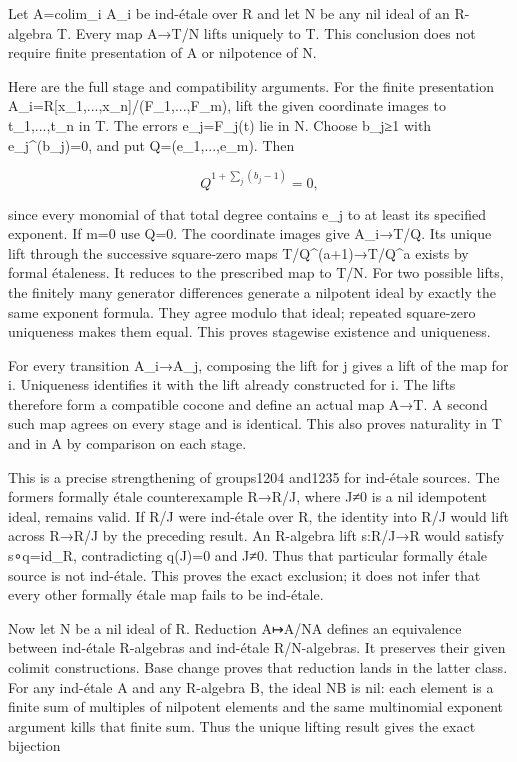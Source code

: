 Let A=colim\_i A\_i be ind-étale over R and let N be any nil ideal of an R-algebra T. Every map A→T/N lifts uniquely to T. This conclusion does not require finite presentation of A or nilpotence of N.

Here are the full stage and compatibility arguments. For the finite presentation A\_i=R{[}x\_1,...,x\_n{]}/(F\_1,...,F\_m), lift the given coordinate images to t\_1,...,t\_n in T. The errors e\_j=F\_j(t) lie in N. Choose b\_j≥1 with e\_j\^{}(b\_j)=0, and put Q=(e\_1,...,e\_m). Then

\[
Q^{1+\sum_j(b_j-1)}=0,
\]

since every monomial of that total degree contains e\_j to at least its specified exponent. If m=0 use Q=0. The coordinate images give A\_i→T/Q. Its unique lift through the successive square-zero maps T/Q\^{}(a+1)→T/Q\^{}a exists by formal étaleness. It reduces to the prescribed map to T/N. For two possible lifts, the finitely many generator differences generate a nilpotent ideal by exactly the same exponent formula. They agree modulo that ideal; repeated square-zero uniqueness makes them equal. This proves stagewise existence and uniqueness.

For every transition A\_i→A\_j, composing the lift for j gives a lift of the map for i. Uniqueness identifies it with the lift already constructed for i. The lifts therefore form a compatible cocone and define an actual map A→T. A second such map agrees on every stage and is identical. This also proves naturality in T and in A by comparison on each stage.

This is a precise strengthening of groups1204 and1235 for ind-étale sources. The former\textquotesingle s formally étale counterexample R→R/J, where J≠0 is a nil idempotent ideal, remains valid. If R/J were ind-étale over R, the identity into R/J would lift across R→R/J by the preceding result. An R-algebra lift s:R/J→R would satisfy s∘q=id\_R, contradicting q(J)=0 and J≠0. Thus that particular formally étale source is not ind-étale. This proves the exact exclusion; it does not infer that every other formally étale map fails to be ind-étale.

Now let N be a nil ideal of R. Reduction A↦A/NA defines an equivalence between ind-étale R-algebras and ind-étale R/N-algebras. It preserves their given colimit constructions. Base change proves that reduction lands in the latter class. For any ind-étale A and any R-algebra B, the ideal NB is nil: each element is a finite sum of multiples of nilpotent elements and the same multinomial exponent argument kills that finite sum. Thus the unique lifting result gives the exact bijection

